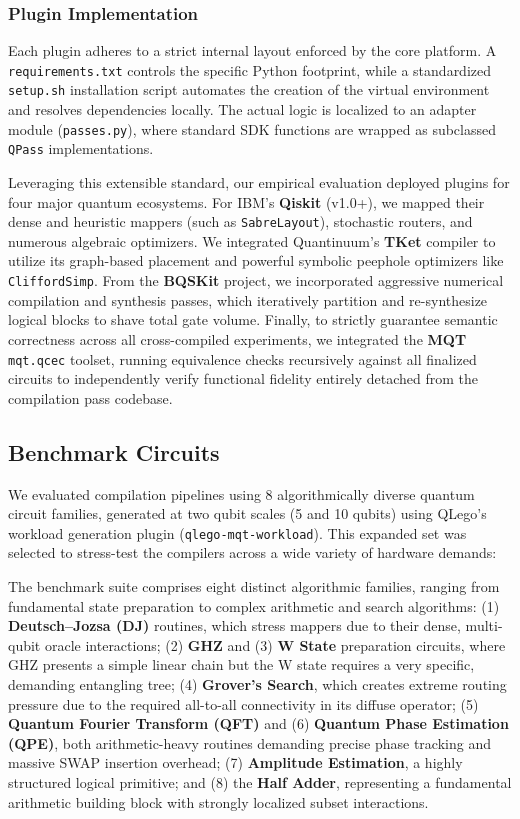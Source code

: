 \documentclass[conference]{IEEEtran}
\begin{document}
\subsubsection{Plugin Implementation}

Each plugin adheres to a strict internal layout enforced by the core platform. A \texttt{requirements.txt} controls the specific Python footprint, while a standardized \texttt{setup.sh} installation script automates the creation of the virtual environment and resolves dependencies locally. The actual logic is localized to an adapter module (\texttt{passes.py}), where standard SDK functions are wrapped as subclassed \texttt{QPass} implementations. 

Leveraging this extensible standard, our empirical evaluation deployed plugins for four major quantum ecosystems. For IBM's \textbf{Qiskit} (v1.0+), we mapped their dense and heuristic mappers (such as \texttt{SabreLayout}), stochastic routers, and numerous algebraic optimizers. We integrated Quantinuum's \textbf{TKet} compiler to utilize its graph-based placement and powerful symbolic peephole optimizers like \texttt{CliffordSimp}. From the \textbf{BQSKit} project, we incorporated aggressive numerical compilation and synthesis passes, which iteratively partition and re-synthesize logical blocks to shave total gate volume. Finally, to strictly guarantee semantic correctness across all cross-compiled experiments, we integrated the \textbf{MQT} \texttt{mqt.qcec} toolset, running equivalence checks recursively against all finalized circuits to independently verify functional fidelity entirely detached from the compilation pass codebase.

\subsection{Benchmark Circuits}
\label{subsec:benchmarks}

We evaluated compilation pipelines using 8 algorithmically diverse quantum circuit families, generated at two qubit scales (5 and 10 qubits) using QLego's workload generation plugin (\texttt{qlego-mqt-workload}). This expanded set was selected to stress-test the compilers across a wide variety of hardware demands:

The benchmark suite comprises eight distinct algorithmic families, ranging from fundamental state preparation to complex arithmetic and search algorithms: (1) \textbf{Deutsch--Jozsa (DJ)} routines, which stress mappers due to their dense, multi-qubit oracle interactions; (2) \textbf{GHZ} and (3) \textbf{W State} preparation circuits, where GHZ presents a simple linear chain but the W state requires a very specific, demanding entangling tree; (4) \textbf{Grover's Search}, which creates extreme routing pressure due to the required all-to-all connectivity in its diffuse operator; (5) \textbf{Quantum Fourier Transform (QFT)} and (6) \textbf{Quantum Phase Estimation (QPE)}, both arithmetic-heavy routines demanding precise phase tracking and massive SWAP insertion overhead; (7) \textbf{Amplitude Estimation}, a highly structured logical primitive; and (8) the \textbf{Half Adder}, representing a fundamental arithmetic building block with strongly localized subset interactions.
\end{document}
